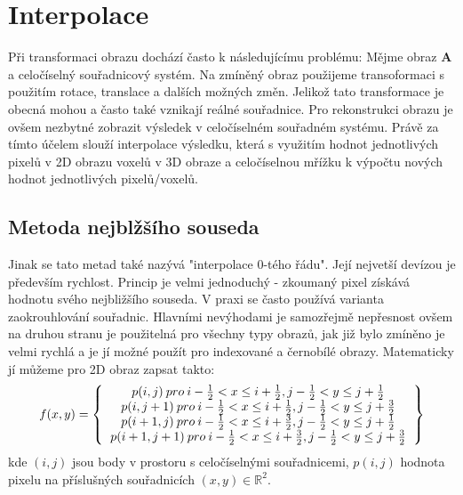 \documentclass{thesis}%
\begin{document}
\section{Interpolace}
Při transformaci obrazu dochází často k následujícímu problému: Mějme obraz $\mathbf{A}$ a celočíselný souřadnicový systém. Na zmíněný obraz použijeme transoformaci s použitím rotace, translace a dalších možných změn. Jelikož tato transformace je obecná mohou a často také vznikají reálné souřadnice. Pro rekonstrukci obrazu je ovšem nezbytné zobrazit výsledek v celočíselném souřadném systému. Právě za tímto účelem slouží interpolace výsledku, která s využitím hodnot jednotlivých pixelů v 2D obrazu voxelů v 3D obraze a celočíselnou mřížku k výpočtu nových hodnot jednotlivých pixelů/voxelů.
 \subsection{Metoda nejblžšího souseda}
Jinak se tato metad také nazývá "interpolace 0-tého řádu". Její nejvetší devízou je především rychlost. Princip je velmi jednoduchý - zkoumaný pixel získává hodnotu svého nejbližšího souseda. V praxi se často používá varianta zaokrouhlování souřadnic. Hlavními nevýhodami je samozřejmě nepřesnost ovšem na druhou stranu je použitelná pro všechny typy obrazů, jak již bylo zmíněno je velmi rychlá a je jí možné použít pro indexované a černobílé obrazy. Matematicky jí můžeme pro 2D obraz zapsat takto:
\begin{equation}
f(x,y) = \left\{
	\begin{tabular}{c}
                        $p(i,j)\: pro\: i - \frac{1}{2} < x \leq i+ \frac{1}{2},  j - \frac{1}{2} < y \leq j+ \frac{1}{2}$ \\
		   $p(i,j+1)\: pro\: i - \frac{1}{2} < x \leq i+ \frac{1}{2},  j - \frac{1}{2} < y \leq j+ \frac{3}{2}$\\
		   $p(i+1,j)\: pro\: i - \frac{1}{2} < x \leq i+ \frac{3}{2},  j - \frac{1}{2} < y \leq j+ \frac{1}{2}$\\ 
		   $p(i+1,j+1)\: pro\: i - \frac{1}{2} < x \leq i+ \frac{3}{2},  j - \frac{1}{2} < y \leq j+ \frac{3}{2}$
	\end{tabular}           
    \right\}
\end{equation}
kde $(i,j)$ jsou body v prostoru s celočíselnými souřadnicemi, $p(i,j)$ hodnota pixelu na příslušných souřadnicích $(x,y)\in \mathbb{R}^2$.
\end{document}
